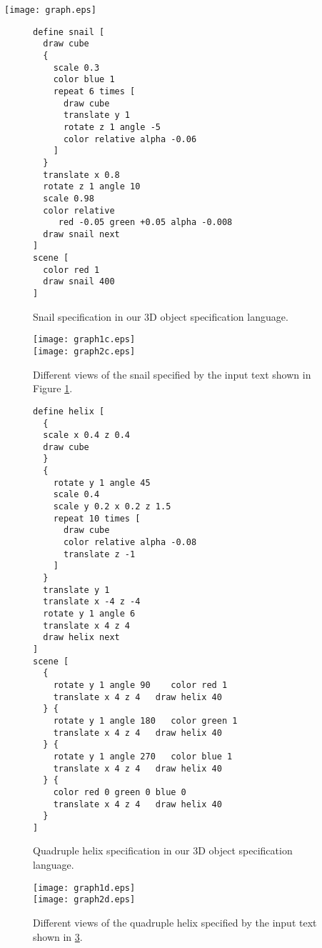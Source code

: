 \documentclass[floatfix,rmp,twocolumn,twoside]{revtex4}
\begin{document}
\begin{figure*}[p!]
\centering
\texttt{[image: graph.eps]}
\caption{ModelCC definition of a 3D object specification language. ModelCC reference resolution support is used to allow the specification of complex 3D objects in the \emph{Definition} class.} \label{fig:graphmodelcc}
\end{figure*}

\begin{figure}[p!]
\begin{verbatim}
define snail [
  draw cube
  {
    scale 0.3
    color blue 1
    repeat 6 times [
      draw cube
      translate y 1
      rotate z 1 angle -5
      color relative alpha -0.06
    ]
  }
  translate x 0.8
  rotate z 1 angle 10
  scale 0.98
  color relative
     red -0.05 green +0.05 alpha -0.008
  draw snail next
]
scene [
  color red 1
  draw snail 400
]
\end{verbatim}
\caption{Snail specification in our 3D object specification language.} \label{fig:examplecode1}
\end{figure}

\begin{figure}[p!]
\centering
\texttt{[image: graph1c.eps]} \\ [0.2cm]
\texttt{[image: graph2c.eps]}

\caption{Different views of the snail specified by the input text shown in Figure \ref{fig:examplecode1}.} \label{fig:examplefig1}
\end{figure}

\begin{figure}[p!]
\begin{verbatim}
define helix [
  {
  scale x 0.4 z 0.4
  draw cube
  }
  {
    rotate y 1 angle 45
    scale 0.4
    scale y 0.2 x 0.2 z 1.5
    repeat 10 times [
      draw cube
      color relative alpha -0.08
      translate z -1
    ]
  }
  translate y 1
  translate x -4 z -4
  rotate y 1 angle 6
  translate x 4 z 4
  draw helix next
]
scene [
  {
    rotate y 1 angle 90    color red 1
    translate x 4 z 4   draw helix 40
  } {
    rotate y 1 angle 180   color green 1
    translate x 4 z 4   draw helix 40
  } {
    rotate y 1 angle 270   color blue 1
    translate x 4 z 4   draw helix 40
  } {
    color red 0 green 0 blue 0
    translate x 4 z 4   draw helix 40
  }
]
\end{verbatim}
\caption{Quadruple helix specification in our 3D object specification language.} \label{fig:examplecode2}
\end{figure}
\begin{figure}[p!]
\centering
\texttt{[image: graph1d.eps]} \\ [0.2cm]
\texttt{[image: graph2d.eps]}

\caption{Different views of the quadruple helix specified by the input text shown in \ref{fig:examplecode2}.} \label{fig:examplefig2}
\end{figure}
\end{document}
